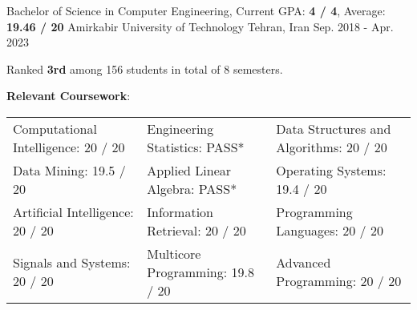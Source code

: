 

\begin{cventries}

  \cventry
    {Bachelor of Science in Computer Engineering, Current GPA: \textbf{4 / 4}, Average: \textbf{19.46 / 20}} %
    {Amirkabir University of Technology} %
    {Tehran, Iran} %
    {Sep. 2018 - Apr. 2023} %
    {
      \begin{cvitems}
        \item{Ranked \textbf{3rd} among 156 students in total of 8 semesters.}
        \item{
          \textbf{Relevant Coursework}:
          \smallskip
          \begin{adjustwidth}{4mm}{}
            \begin{tabular}{l@{\hskip 5mm}l@{\hskip 5mm}l}
              Computational Intelligence: 20 / 20 & Engineering Statistics: PASS*    & Data Structures and Algorithms: 20 / 20 \\
              Data Mining: 19.5 / 20              & Applied Linear Algebra: PASS*    & Operating Systems: 19.4 / 20            \\
              Artificial Intelligence: 20 / 20    & Information Retrieval: 20 / 20   & Programming Languages: 20 / 20          \\
              Signals and Systems: 20 / 20        & Multicore Programming: 19.8 / 20 & Advanced Programming: 20 / 20  

\end{tabular}
\end{adjustwidth}}
\end{cvitems}}
\end{cventries}
